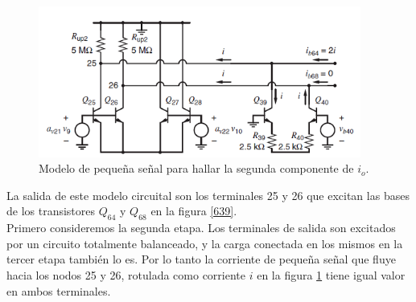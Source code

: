 \documentclass[12pt,a4paper,final,headinclude,footinclude,BCOR5mm]{scrartcl}
\begin{document}
\begin{figure}[!h]
\begin{center}
\includegraphics[width=300pt]{./imagenes/648.png}
\end{center}
\caption{Modelo de pequeña señal para hallar la segunda componente de $i_{o}$.}
\label{648}
\end{figure}

La salida de este modelo circuital son los terminales 25 y 26 que excitan las bases de los transistores $Q_{64}$ y $Q_{68}$ en la figura \ref{639}.\\ 

Primero consideremos la segunda etapa. Los terminales de salida son excitados por un circuito totalmente balanceado, y la carga conectada en los mismos en la tercer etapa también lo es. Por lo tanto la corriente de pequeña señal que fluye hacia los nodos 25 y 26, rotulada como corriente $i$ en la figura \ref{648} tiene igual valor en ambos terminales.\\
\end{document}
